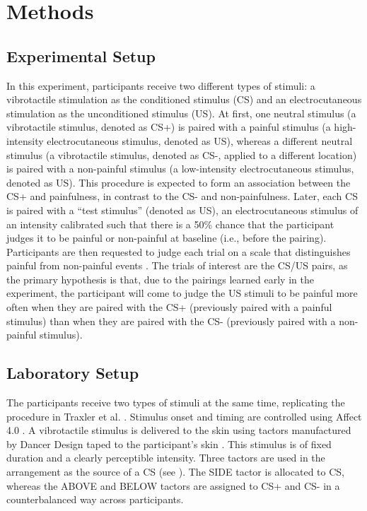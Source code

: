 \documentclass{article}
\begin{document}
\section{Methods} 

\subsection{Experimental Setup} 

In this experiment, participants receive two different types of stimuli: a vibrotactile stimulation as the conditioned stimulus (CS) and an electrocutaneous stimulation as the unconditioned stimulus (US). At first, one neutral stimulus (a vibrotactile stimulus, denoted as CS+) is paired with a painful stimulus (a high-intensity electrocutaneous stimulus, denoted as US), whereas a different neutral stimulus (a vibrotactile stimulus, denoted as CS-, applied to a different location) is paired with a non-painful stimulus (a low-intensity electrocutaneous stimulus, denoted as US). This procedure is expected to form an association between the CS+ and painfulness, in contrast to the CS- and non-painfulness. Later, each CS is paired with a “test stimulus” (denoted as US), an electrocutaneous stimulus of an intensity calibrated such that there is a 50\% chance that the participant judges it to be painful or non-painful at baseline (i.e., before the pairing). Participants are then requested to judge each trial on a scale that distinguishes painful from non-painful events \autocite{bib40}. The trials of interest are the CS/US pairs, as the primary hypothesis is that, due to the pairings learned early in the experiment, the participant will come to judge the US stimuli to be painful more often when they are paired with the CS+ (previously paired with a painful stimulus) than when they are paired with the CS- (previously paired with a non-painful stimulus).

\subsection{Laboratory Setup} 

The participants receive two types of stimuli at the same time, replicating the procedure in Traxler et al. \autocite{bib7}. Stimulus onset and timing are controlled using Affect 4.0 \autocite{bib41}. A vibrotactile stimulus is delivered to the skin using tactors manufactured by Dancer Design taped to the participant's skin \autocite{bib42}. This stimulus is of fixed duration and a clearly perceptible intensity. Three tactors are used in the arrangement as the source of a CS (see \autocite{bibFigure 1}). The SIDE tactor is allocated to CS, whereas the ABOVE and BELOW tactors are assigned to CS+ and CS- in a counterbalanced way across participants.
\end{document}
